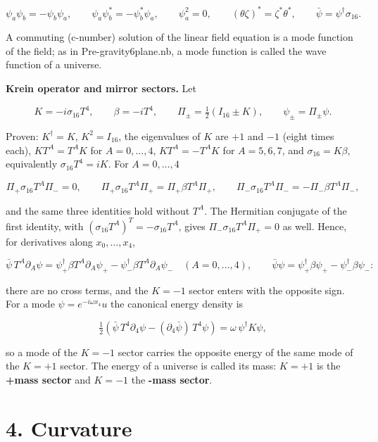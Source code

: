 \documentclass[10pt]{article}
\makeatletter
\newcommand\keepnext{\par\nopagebreak\@nobreaktrue\everypar{\@nobreakfalse\everypar{}}}
\makeatother
\begin{document}
\[
\psi_a\psi_b = -\psi_b\psi_a, \qquad \psi_a\psi_b^* = -\psi_b^*\psi_a, \qquad \psi_a^2 = 0, \qquad (\theta\zeta)^* = \zeta^*\theta^*, \qquad \bar\psi = \psi^\dagger\sigma_{16} .
\]

A commuting (c-number) solution of the linear field equation is a mode function of the field; as in Pre-gravity6plane.nb, a mode function is called the wave function of a universe.


\textbf{Krein operator and mirror sectors.} Let\keepnext


\[
K = -i\sigma_{16}T^4, \qquad \beta = -iT^4, \qquad \Pi_\pm = \tfrac12\left(I_{16} \pm K\right), \qquad \psi_\pm = \Pi_\pm\psi .
\]

Proven: $K^\dagger = K$, $K^2 = I_{16}$, the eigenvalues of $K$ are $+1$ and $-1$ (eight times each), $KT^A = T^AK$ for $A = 0, \dots, 4$, $KT^A = -T^AK$ for $A = 5, 6, 7$, and $\sigma_{16} = K\beta$, equivalently $\sigma_{16}T^4 = iK$. For $A = 0, \dots, 4$\keepnext


\[
\Pi_+\sigma_{16}T^A\Pi_- = 0, \qquad \Pi_+\sigma_{16}T^A\Pi_+ = \Pi_+\beta T^A\Pi_+, \qquad \Pi_-\sigma_{16}T^A\Pi_- = -\Pi_-\beta T^A\Pi_- ,
\]

and the same three identities hold without $T^A$. The Hermitian conjugate of the first identity, with $(\sigma_{16}T^A)^T = -\sigma_{16}T^A$, gives $\Pi_-\sigma_{16}T^A\Pi_+ = 0$ as well. Hence, for derivatives along $x_0, \dots, x_4$,\keepnext


\[
\bar\psi\,T^A\partial_A\psi = \psi_+^\dagger\beta T^A\partial_A\psi_+ - \psi_-^\dagger\beta T^A\partial_A\psi_- \quad (A = 0, \dots, 4), \qquad \bar\psi\psi = \psi_+^\dagger\beta\psi_+ - \psi_-^\dagger\beta\psi_- :
\]

there are no cross terms, and the $K = -1$ sector enters with the opposite sign. For a mode $\psi = e^{-i\omega x_4}u$ the canonical energy density is\keepnext


\[
\tfrac12\left(\bar\psi\,T^4\partial_4\psi - (\partial_4\bar\psi)\,T^4\psi\right) = \omega\,\psi^\dagger K\psi ,
\]

so a mode of the $K = -1$ sector carries the opposite energy of the same mode of the $K = +1$ sector. The energy of a universe is called its mass: $K = +1$ is the \textbf{+mass sector} and $K = -1$ the \textbf{-mass sector}.


\section*{4. Curvature}
\end{document}
